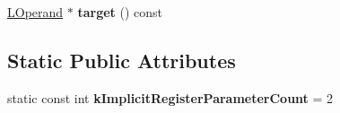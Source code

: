 \begin{DoxyCompactItemize}
\item 
\hyperlink{classv8_1_1internal_1_1_l_operand}{L\+Operand} $\ast$ {\bfseries target} () const \hypertarget{classv8_1_1internal_1_1_l_call_with_descriptor_a5f36cfb0ab3007ac639a4fa68b4b4162}{}\label{classv8_1_1internal_1_1_l_call_with_descriptor_a5f36cfb0ab3007ac639a4fa68b4b4162}

\end{DoxyCompactItemize}
\subsection*{Static Public Attributes}
\begin{DoxyCompactItemize}
\item 
static const int {\bfseries k\+Implicit\+Register\+Parameter\+Count} = 2\hypertarget{classv8_1_1internal_1_1_l_call_with_descriptor_ac325c55cda5a480a405e83950024fd00}{}\label{classv8_1_1internal_1_1_l_call_with_descriptor_ac325c55cda5a480a405e83950024fd00}

\end{DoxyCompactItemize}
